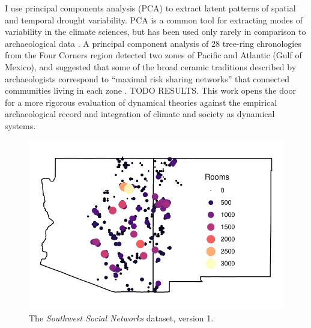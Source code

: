 \documentclass[10pt]{iopart}
\begin{document}
I use principal components analysis (PCA) to extract latent patterns of spatial and temporal drought variability. PCA is a common tool for extracting modes of variability in the climate sciences, but has been used only rarely in comparison to archaeological data \parencite{Weiss1982, Cordell2007}. A principal component analysis of 28 tree-ring chronologies from the Four Corners region detected two zones of Pacific and Atlantic (Gulf of Mexico), and suggested that some of the broad ceramic traditions described by archaeologists correspond to ``maximal risk sharing networks'' that connected communities living in each zone \parencite{Cordell2007}. TODO RESULTS. This work opens the door for a more rigorous evaluation of dynamical theories against the empirical archaeological record and integration of climate and society as dynamical systems.


\begin{figure}[!ht]
\centering
\includegraphics[width=.9\linewidth]{figures/site_distribution.pdf}
\caption{The \emph{Southwest Social Networks} dataset, version 1.} 
\label{fig:network-plot}
\end{figure}
\end{document}
